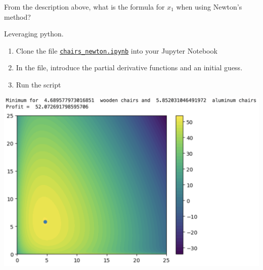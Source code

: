 \documentclass{workbook}
\begin{document}
\begin{slide}


\begin{parts}
\setcounter{partsitem}{3}
	\item From the description above, what is the formula for $x_1$ when using Newton's method?
	
\begin{slidesonly}
	\bigskip
\end{slidesonly}
	
	\item Leveraging python.
	\begin{enumerate}
		\item Clone the file \href{https://utoronto.syzygy.ca/jupyter/user-redirect/git-pull?repo=https://github.com/bigfatbernie/IBLMathModeling&subPath=python/chairs_newton.ipynb}{\tt chairs\_newton.ipynb} into your Jupyter Notebook
		\item In the file, introduce the partial derivative functions and an initial guess.
		\item Run the script
	\end{enumerate}
\end{parts}
\end{slide}


\begin{slide}

\includegraphics[width=.75\textwidth]{images/chairs-profit.png}
	
\end{slide}
\end{document}
